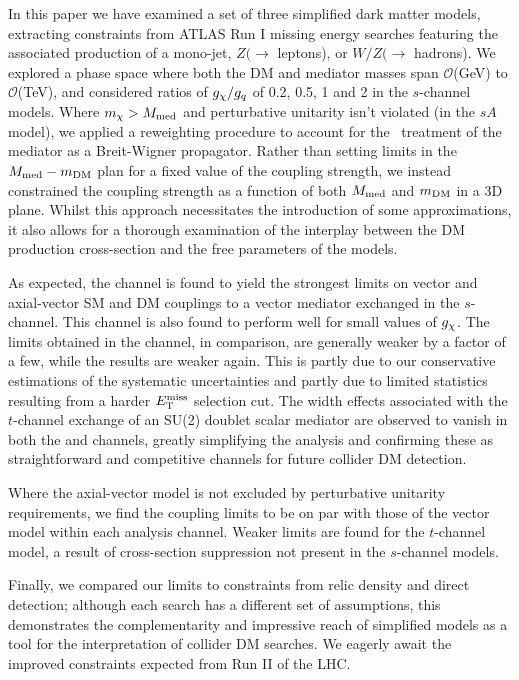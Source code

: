 
In this paper we have examined a set of three simplified dark matter models, extracting constraints from ATLAS Run I missing energy searches featuring the associated production of a mono-jet, $Z(\rightarrow$ leptons), or $W/Z (\rightarrow$ hadrons). We explored a phase space where both the DM and mediator masses span $\mathcal{O}$(GeV) to $\mathcal{O}$(TeV), and considered ratios of $g_{\chi} / g_q$ of 0.2, 0.5, 1 and 2 in the $s$-channel models. Where $m_{\chi} > M_{\mathrm{med}}$ and perturbative unitarity isn't violated (in the $sA$ model), we applied a reweighting procedure to account for the \MG~treatment of the mediator as a Breit-Wigner propagator.  Rather than setting limits in the $M_{\mathrm{med}} - m_{\mathrm{DM}}$ plan for a fixed value of the coupling strength, we instead constrained the coupling strength as a function of both $M_{\mathrm{med}}$ and $m_{\mathrm{DM}}$ in a 3D plane. Whilst this approach necessitates the introduction of some approximations, it also allows for a thorough examination of the interplay between the DM production cross-section and the free parameters of the models.

As expected, the \monojet channel is found to yield the strongest limits on vector and axial-vector SM and DM couplings to a vector mediator exchanged in the $s$-channel. This channel is also found to perform well for small values of $g_{\chi}$. The limits obtained in the \monoZ channel, in comparison, are generally weaker by a factor of a few, while the \monoWZ results are weaker again. This is partly due to our conservative estimations of the systematic uncertainties and partly due to limited statistics resulting from a harder $E_{\mathrm{T}}^{\mathrm{miss}}$ selection cut. The width effects associated with the $t$-channel exchange of an SU(2) doublet scalar mediator are observed to vanish in both the \monoZ and \monoWZ channels, greatly simplifying the analysis and confirming these as straightforward and competitive channels for future collider DM detection. 

Where the axial-vector model is not excluded by perturbative unitarity requirements, we find the coupling limits to be on par with those of the vector model within each analysis channel. Weaker limits are found for the $t$-channel model, a result of cross-section suppression not present in the $s$-channel models.

Finally, we compared our limits to constraints from relic density and direct detection; although each search has a different set of assumptions, this demonstrates the complementarity and impressive reach of simplified models as a tool for the interpretation of collider DM searches. We eagerly await the improved constraints expected from Run II of the LHC.


